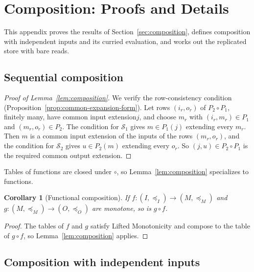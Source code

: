 \documentclass[sigconf]{cidr-2027}
\newtheorem{corollary}{Corollary}
\theoremstyle{remark}
\newcommand{\InputOrd}{\preceq_I}
\newcommand{\OutputOrd}{\preceq_O}
\newcommand{\indesc}{input extension\xspace} %
\newcommand{\outrelpart}{extending\xspace}    %
\newcommand{\outnoun}{output extension\xspace}%
\newcommand{\Spec}{\mathcal{S}}
\begin{document}
\section{Composition: Proofs and Details}
\label{app:composition}

This appendix proves the results of Section~\ref{sec:composition}, defines
composition with independent inputs and its curried evaluation, and works out
the replicated store with bare reads.

\subsection{Sequential composition}

\begin{proof}[Proof of Lemma~\ref{lem:composition}]
We verify the row-consistency condition
(Proposition~\ref{prop:common-expansion-form}). Let rows $(i_r,o_r)$ of
$P_2\circ P_1$, finitely many, have common \indesc $j$, and choose $m_r$ with
$(i_r,m_r)\in P_1$ and $(m_r,o_r)\in P_2$. The condition for $\Spec_1$ gives
$m\in P_1(j)$ \outrelpart every $m_r$. Then $m$ is a common \indesc of the
inputs of the rows $(m_r,o_r)$, and the condition for $\Spec_2$ gives
$u\in P_2(m)$ \outrelpart every $o_r$. So $(j,u)\in P_2\circ P_1$ is the
required common \outnoun.
\end{proof}

Tables of functions are closed under $\circ$, so Lemma~\ref{lem:composition}
specializes to functions.

\begin{corollary}[Functional composition]
\label{cor:functional-composition}
If $f:(I,\InputOrd)\to(M,\preceq_M)$ and
$g:(M,\preceq_M)\to(O,\OutputOrd)$ are monotone, so is $g\circ f$.
\end{corollary}

\begin{proof}
The tables of $f$ and $g$ satisfy Lifted Monotonicity and compose to the
table of $g\circ f$, so Lemma~\ref{lem:composition} applies.
\end{proof}

\subsection{Composition with independent inputs}
\label{sec:parameterized-composition}
\end{document}
